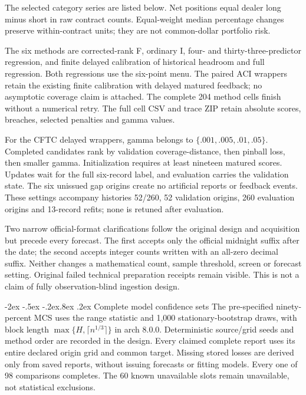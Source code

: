 \documentclass[10pt,a4paper]{article}
\makeatletter
\renewcommand\section{\@startsection{section}{1}{\z@}%
  {-2ex \@plus -.5ex \@minus -.2ex}{.8ex \@plus .2ex}%
  {\normalfont\large\bfseries}}
\makeatother
\begin{document}
The selected category series are listed below. Net positions equal dealer long minus short in raw contract counts. Equal-weight median percentage changes preserve within-contract units; they are not common-dollar portfolio risk.


The six methods are corrected-rank F, ordinary I, four- and thirty-three-predictor regression, and finite delayed calibration of historical headroom and full regression. Both regressions use the six-point menu. The paired ACI wrappers retain the existing finite calibration with delayed matured feedback; no asymptotic coverage claim is attached. The complete 204 method cells finish without a numerical retry. The full cell CSV and trace ZIP retain absolute scores, breaches, selected penalties and gamma values.

For the CFTC delayed wrappers, gamma belongs to $\{.001,.005,.01,.05\}$. Completed candidates rank by validation coverage-distance, then pinball loss, then smaller gamma. Initialization requires at least nineteen matured scores. Updates wait for the full six-record label, and evaluation carries the validation state. The six unissued gap origins create no artificial reports or feedback events. These settings accompany histories 52/260, 52 validation origins, 260 evaluation origins and 13-record refits; none is retuned after evaluation.

Two narrow official-format clarifications follow the original design and acquisition but precede every forecast. The first accepts only the official midnight suffix after the date; the second accepts integer counts written with an all-zero decimal suffix. Neither changes a mathematical count, sample threshold, screen or forecast setting. Original failed technical preparation receipts remain visible. This is not a claim of fully observation-blind ingestion design.

\clearpage
\section{Complete model confidence sets}\label{sup:v10-mcs}
The pre-specified ninety-percent MCS uses the range statistic and 1,000 stationary-bootstrap draws, with block length $\max\{H,\lceil n^{1/3}\rceil\}$ in arch 8.0.0. Deterministic source/grid seeds and method order are recorded in the design. Every claimed complete report uses its entire declared origin grid and common target. Missing stored losses are derived only from saved reports, without issuing forecasts or fitting models. Every one of 98 comparisons completes. The 60 known unavailable slots remain unavailable, not statistical exclusions.
\end{document}
